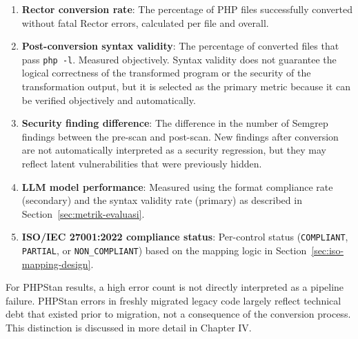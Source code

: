 \begin{enumerate}

    \item \textbf{Rector conversion rate}: The percentage of PHP files successfully converted without fatal Rector errors, calculated per file and overall.

    \item \textbf{Post-conversion syntax validity}: The percentage of converted files that pass \texttt{php -l}. Measured objectively. Syntax validity does not guarantee the logical correctness of the transformed program or the security of the transformation output, but it is selected as the primary metric because it can be verified objectively and automatically.

    \item \textbf{Security finding difference}: The difference in the number of Semgrep findings between the pre-scan and post-scan. New findings after conversion are not automatically interpreted as a security regression, but they may reflect latent vulnerabilities that were previously hidden.

    \item \textbf{LLM model performance}: Measured using the format compliance rate (secondary) and the syntax validity rate (primary) as described in Section~\ref{sec:metrik-evaluasi}.

    \item \begin{sloppypar}\textbf{ISO/IEC 27001:2022 compliance status}: Per-control status (\texttt{COMPLIANT}, \texttt{PARTIAL}, or \texttt{NON\_COMPLIANT}) based on the mapping logic in Section~\ref{sec:iso-mapping-design}.\end{sloppypar}

\end{enumerate}

For PHPStan results, a high error count is not directly interpreted as a pipeline failure. PHPStan errors in freshly migrated legacy code largely reflect technical debt that existed prior to migration, not a consequence of the conversion process. This distinction is discussed in more detail in Chapter IV.